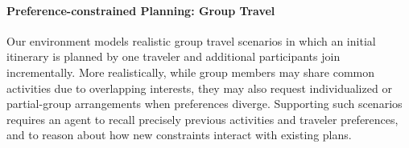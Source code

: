 \paragraph{Preference-constrained Planning: Group Travel}

Our environment models realistic group travel scenarios in which an initial itinerary is planned by one traveler and additional participants join incrementally. More realistically, while group members may share common activities due to overlapping interests, they may also request individualized or partial-group arrangements when preferences diverge. Supporting such scenarios requires an agent to recall precisely previous activities and traveler preferences, and to reason about how new constraints interact with existing plans.

